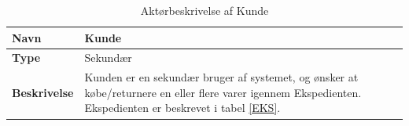 \begin{table}[H]
	\label{KD}
	\begin{tabularx}{\textwidth}{|l|X|}
		\hline
		\textbf{Navn} & Kunde \\
		\hline
		\textbf{Type} & Sekundær \\
		\hline
		\textbf{Beskrivelse} & Kunden er en sekundær bruger af systemet, og ønsker at købe/returnere en eller flere varer igennem Ekspedienten. Ekspedienten er beskrevet i tabel \ref{EKS}.   \\
		\hline
	\end{tabularx}
	\captionsetup{justification=raggedright,singlelinecheck=false}
	\caption{Aktørbeskrivelse af Kunde}
	\label{tab:AktKu}
\end{table}
